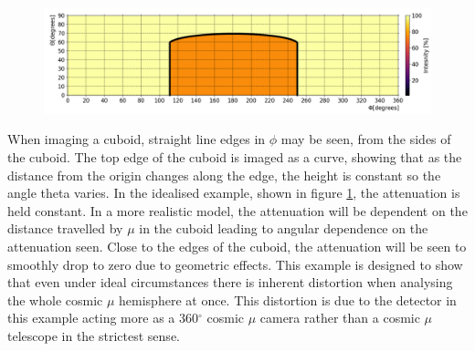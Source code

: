  \begin{figure}[!h]
 \centering
 \includegraphics[width=\linewidth]{Chapter5/Figs/wylfaRasterNew/phiVsThetaExpectedInferno_outlined.png}
 \label{fig:thetaVsPhiExpectedCube}
\end{figure}

When imaging a cuboid, straight line edges in $\phi$ may be seen, from the sides of the cuboid. The top edge of the cuboid is imaged as a curve, showing that as the distance from the origin changes along the edge, the height is constant so the angle theta varies. In the idealised example, shown in figure \ref{fig:thetaVsPhiExpectedCube}, the attenuation is held constant. In a more realistic model, the attenuation will be dependent on the distance travelled by $\mu$ in the cuboid leading to angular dependence on the attenuation seen. Close to the edges of the cuboid, the attenuation will be seen to smoothly drop to zero due to geometric effects. This example is designed to show that even under ideal circumstances there is inherent distortion when analysing the whole cosmic $\mu$ hemisphere at once. This distortion is due to the detector in this example acting more as a 360$^\circ$ cosmic $\mu$ camera rather than a cosmic $\mu$ telescope in the strictest sense.

